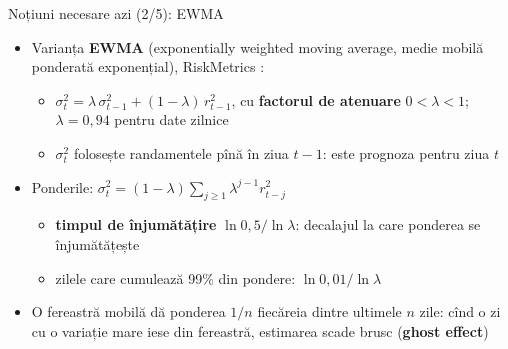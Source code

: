 \begin{frame}{Noțiuni necesare azi (2/5): EWMA}
\itemsize{\small}
\begin{itemize}
    \item Varianța \textbf{EWMA} (exponentially weighted moving average, medie mobilă ponderată exponențial), RiskMetrics :
    \begin{itemize}
        \item $\sigma_t^2 = \lambda\,\sigma_{t-1}^2 + (1-\lambda)\,r_{t-1}^2$, cu \textbf{factorul de atenuare} $0 < \lambda < 1$; $\lambda = 0{,}94$ pentru date zilnice
        \item $\sigma_t^2$ folosește randamentele pînă în ziua $t-1$: este prognoza pentru ziua $t$
    \end{itemize}
    \item Ponderile: $\sigma_t^2 = (1-\lambda)\sum_{j \ge 1}\lambda^{j-1}r_{t-j}^2$
    \begin{itemize}
        \item \textbf{timpul de înjumătățire} $\ln 0{,}5/\ln\lambda$: decalajul la care ponderea se înjumătățește
        \item zilele care cumulează 99\% din pondere: $\ln 0{,}01/\ln\lambda$
    \end{itemize}
    \item O fereastră mobilă dă ponderea $1/n$ fiecăreia dintre ultimele $n$ zile: cînd o zi cu o variație mare iese din fereastră, estimarea scade brusc (\textbf{ghost effect})
\end{itemize}
\end{frame}

